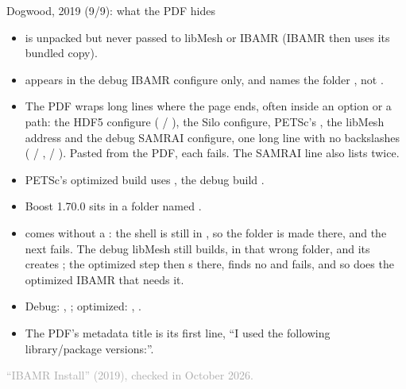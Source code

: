 \documentclass[aspectratio=169,11pt]{beamer}
\newcommand{\sourcecredit}[1]{\vfill\begin{flushright}\tiny\textcolor{DarkGray}{#1}\end{flushright}}
\begin{document}
\begin{frame}{Dogwood, 2019 (9/9): what the PDF hides}
\label{fr:dw19slips}
\footnotesize
\begin{itemize}\setlength{\itemsep}{3pt}
  \item {} is unpacked but never passed to libMesh or IBAMR (IBAMR then uses its bundled copy).
  \item {} appears in the debug IBAMR configure only, and names the folder , not .
  \item The PDF wraps long lines where the page ends, often inside an option or a path: the HDF5 configure ( / ), the Silo configure, PETSc's , the libMesh  address and the debug SAMRAI configure, one long line with no backslashes ( / , \code{--} / ). Pasted from the PDF, each fails. The SAMRAI line also lists  twice.
  \item PETSc's optimized build uses , the debug build .
  \item Boost 1.70.0 sits in a folder named .
  \item {} comes without a : the shell is still in , so the folder is made there, and the next  fails. The debug libMesh still builds, in that wrong folder, and its  creates ; the optimized step then s there, finds no  and fails, and so does the optimized IBAMR that needs it.
  \item Debug: , ; optimized: , .
  \item The PDF's metadata title is its first line, ``I used the following library/package versions:''.
\end{itemize}
\sourcecredit{``IBAMR Install'' (2019), checked in October 2026.}
\end{frame}
\end{document}
